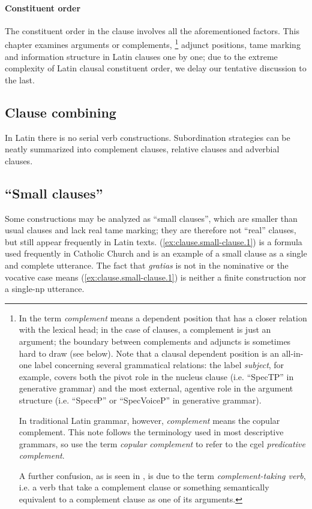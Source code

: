 \documentclass[a4paper, oneside, 12pt]{report}
\newcommand*{\term}[1]{\emph{#1}}
\newcommand{\form}[1]{\emph{#1}}
\newcommand{\vP}{\textit{v}P}
\begin{document}
\paragraph*{Constituent order} 
The constituent order in the clause involves all the aforementioned factors.
This chapter examines arguments or complements,
\footnote{
    In \citet{cgel} the term \term{complement} means a 
    dependent position that has a closer relation with the lexical head;
    in the case of clauses, a complement is just an argument;
    the boundary between complements and adjuncts is sometimes hard to draw (see below).    
    Note that a clausal dependent position is 
    an all-in-one label concerning several grammatical relations:
    the label \term{subject}, for example, 
    covers both the pivot role in the nucleus clause 
    (i.e. ``SpecTP'' in generative grammar) 
    and the most external, agentive role in the argument structure
    (i.e. ``Spec\vP'' or ``SpecVoiceP'' in generative grammar).

    In traditional Latin grammar, however, \term{complement} means the copular complement. 
    This note follows the terminology used in most descriptive grammars,
    so use the term \term{copular complement} to refer to the \ac{cgel} \term{predicative complement}.

    A further confusion, as is seen in , 
    is due to the term \term{complement-taking verb}, 
    i.e. a verb that take a complement clause 
    or something semantically equivalent to a complement clause
    as one of its arguments.
}
adjunct positions, \ac{tame} marking and information structure in Latin clauses one by one;
due to the extreme complexity of Latin clausal constituent order, 
we delay our tentative discussion to the last.

\subsection{Clause combining}

In Latin there is no serial verb constructions.
Subordination strategies can be neatly summarized into 
complement clauses, relative clauses and adverbial clauses.

\subsection{``Small clauses''}

Some constructions may be analyzed as ``small clauses'', 
which are smaller than usual clauses 
and lack real \acs{tame} marking;
they are therefore not ``real'' clauses, 
but still appear frequently in Latin texts.
(\ref{ex:clause.small-clause.1}) is a formula used frequently in Catholic Church 
and is an example of a small clause 
as a single and complete utterance.
The fact that \form{gratias} is not in the nominative or the vocative case 
means (\ref{ex:clause.small-clause.1}) is 
neither a finite construction nor a single-\acs{np} utterance.
\end{document}
